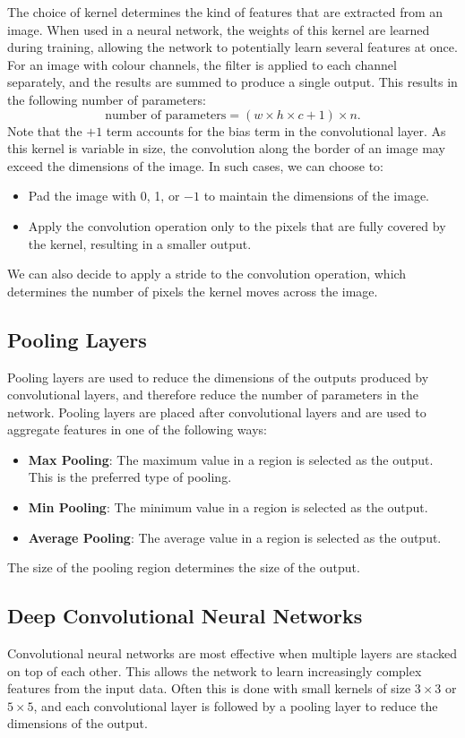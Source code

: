 \documentclass{article}
\begin{document}
The choice of kernel determines the kind of features that are extracted
from an image. When used in a neural network, the weights of this
kernel are learned during training, allowing the network to potentially
learn several features at once. For an image with colour channels, the
filter is applied to each channel separately, and the results are
summed to produce a single output. This results in the following number
of parameters:
\begin{equation*}
    \text{number of parameters} = \left( w \times h \times c + 1 \right) \times n.
\end{equation*}
Note that the \(+1\) term accounts for the bias term in the convolutional
layer. As this kernel is variable in size, the convolution along the
border of an image may exceed the dimensions of the image. In such cases,
we can choose to:
\begin{itemize}
    \item Pad the image with 0, 1, or \(-1\) to maintain the dimensions
          of the image.
    \item Apply the convolution operation only to the pixels that are
          fully covered by the kernel, resulting in a smaller output.
\end{itemize}
We can also decide to apply a stride to the convolution operation, which
determines the number of pixels the kernel moves across the image.
\subsection{Pooling Layers}
Pooling layers are used to reduce the dimensions of the outputs
produced by convolutional layers, and therefore reduce the number of
parameters in the network. Pooling layers are placed after
convolutional layers and are used to aggregate features in one of the
following ways:
\begin{itemize}
    \item \textbf{Max Pooling}: The maximum value in a region is
          selected as the output. This is the preferred type of pooling.
    \item \textbf{Min Pooling}: The minimum value in a region is
          selected as the output.
    \item \textbf{Average Pooling}: The average value in a region is
          selected as the output.
\end{itemize}
The size of the pooling region determines the size of the output.
\subsection{Deep Convolutional Neural Networks}
Convolutional neural networks are most effective when multiple layers
are stacked on top of each other. This allows the network to learn
increasingly complex features from the input data. Often this is done
with small kernels of size \(3 \times 3\) or \(5 \times 5\), and each
convolutional layer is followed by a pooling layer to reduce the
dimensions of the output.
\end{document}

